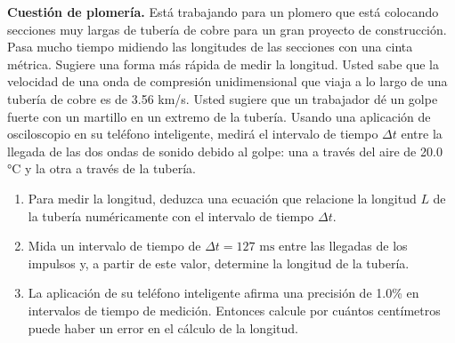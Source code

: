 \item \textbf{Cuestión de plomería.}
Está trabajando para un plomero que está colocando secciones muy largas de tubería de cobre para un gran proyecto de construcción. Pasa mucho tiempo midiendo las longitudes de las secciones con una cinta métrica. Sugiere una forma más rápida de medir la longitud. Usted sabe que la velocidad de una onda de compresión unidimensional que viaja a lo largo de una tubería de cobre es de 3.56 km/s. Usted sugiere que un trabajador dé un golpe fuerte con un martillo en un extremo de la tubería. Usando una aplicación de osciloscopio en su teléfono inteligente, medirá el intervalo de tiempo $\Delta t$ entre la llegada de las dos ondas de sonido debido al golpe: una a través del aire de 20.0 °C y la otra a través de la tubería.
\begin{enumerate}
    \item Para medir la longitud, deduzca una ecuación que relacione la longitud $L$ de la tubería numéricamente con el intervalo de tiempo $\Delta t$.
    \item Mida un intervalo de tiempo de $\Delta t = 127\text{ ms}$ entre las llegadas de los impulsos y, a partir de este valor, determine la longitud de la tubería.
    \item La aplicación de su teléfono inteligente afirma una precisión de 1.0\% en intervalos de tiempo de medición. Entonces calcule por cuántos centímetros puede haber un error en el cálculo de la longitud.
\end{enumerate}